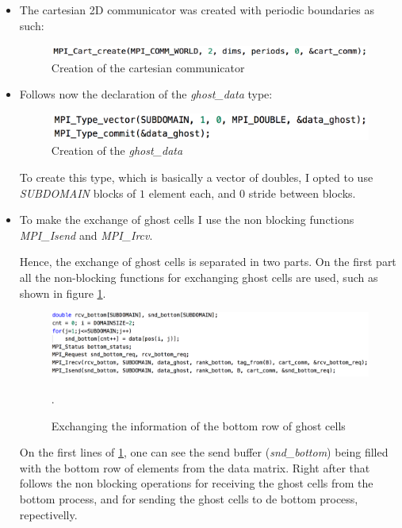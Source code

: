\documentclass[unicode,11pt,a4paper,oneside,numbers=endperiod,openany]{scrartcl}
\begin{document}
\begin{itemize}

    \item The cartesian 2D communicator was created with periodic boundaries as such:
        \begin{figure}[H]
            \includegraphics[width=\linewidth]{cart}
            \caption{Creation of the cartesian communicator}
        \end{figure}

    \item Follows now the declaration of the \textit{ghost\_data} type:
        \begin{figure}[H]
            \includegraphics[width=\linewidth]{"createdata"}
            \caption{Creation of the \textit{ghost\_data}}
        \end{figure}

        To create this type, which is basically a vector of doubles, I opted to use \textit{SUBDOMAIN} blocks of $1$ element each, and $0$ stride between blocks.

    \item To make the exchange of ghost cells I use the non blocking functions \textit{MPI\_Isend} and \textit{MPI\_Ircv}.

        Hence, the exchange of ghost cells is separated in two parts.
        On the first part all the non-blocking functions for exchanging ghost cells are used, such as shown in figure \ref{bottom_send}.

        \begin{figure}
            \includegraphics[width=\linewidth]{send_rcv_bottom}
            \caption{Exchanging the information of the bottom row of ghost cells}.
            \label{bottom_send}
        \end{figure}

        On the first lines of \ref{bottom_send}, one can see the send buffer (\textit{snd\_bottom}) being filled with the bottom row of elements from the data matrix.
        Right after that follows the non blocking operations for receiving the ghost cells from the bottom process, and for sending the ghost cells to de bottom process, repectivelly.


\end{itemize}
\end{document}
